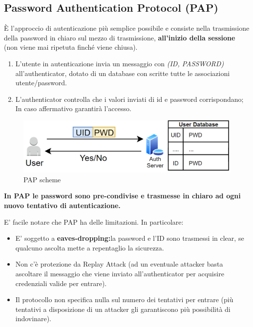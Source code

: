 \subsection{Password Authentication Protocol (PAP)}
È l'approccio di autenticazione più semplice possibile e consiste nella trasmissione della password in chiaro sul mezzo di trasmissione, \textbf{all'inizio della sessione} (non viene mai ripetuta finché viene chiusa).
\begin{proposition}\label{prop:pap}
\begin{enumerate}
    \item L'utente in autenticazione invia un messaggio con \textit{(ID, PASSWORD)} all'authenticator, dotato di un database con scritte tutte le associazioni utente/password.
    \item L'authenticator controlla che i valori inviati di id e password corrispondano; In caso affermativo garantirà l’accesso.
\end{enumerate}
\end{proposition}
\begin{figure}[ht]
    \centering
    \includegraphics[width=\textwidth]{image/pap.png}
    \caption{PAP scheme}
    \label{fig:pap}
\end{figure}
\begin{remark}
\textbf{In PAP le password sono pre-condivise e trasmesse in chiaro ad ogni nuovo tentativo di autenticazione.}
\end{remark}
E' facile notare che PAP ha delle limitazioni. In particolare:
\begin{itemize}
    \item  E' soggetto a \textbf{eaves-dropping:}la password e l'ID sono trasmessi in clear, se qualcuno ascolta mette a repentaglio la sicurezza. 
    \item Non c'è protezione da Replay Attack (ad un eventuale attacker basta ascoltare il messaggio che viene inviato all'authenticator per acquisire credenziali valide per entrare). 
    \item Il protocollo non specifica nulla sul numero dei tentativi per entrare (più tentativi a disposizione di un attacker gli garantiscono più possibilità di indovinare).
\end{itemize}
